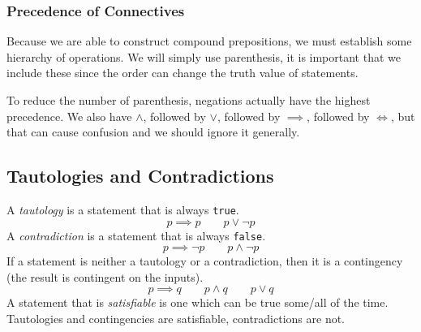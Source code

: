 \subsubsection{Precedence of Connectives}\label{ssub:precedence_of_connectives}

Because we are able to construct compound prepositions, we must establish some hierarchy of operations.
We will simply use parenthesis, it is important that we include these since the order can change the truth value of statements.
\begin{note}
    To reduce the number of parenthesis, negations actually have the highest precedence.
    We also have \(\land\), followed by \(\lor\), followed by \(\implies\), followed by \(\iff\), but that can cause confusion and we should ignore it generally.
\end{note}

\subsection{Tautologies and Contradictions}\label{sub:tautologies_and_contradictions}

A \emph{tautology} is a statement that is always \texttt{true}.
\[
    p \implies p \qquad p \lor \neg p
\]
A \emph{contradiction} is a statement that is always \texttt{false}.
\[
    p \implies \neg p \qquad p \land \neg p
\]
If a statement is neither a tautology or a contradiction, then it is a contingency (the result is contingent on the inputs).
\[
    p \implies q \qquad p \land q \qquad p \lor q
\]
A statement that is \emph{satisfiable} is one which can be true some/all of the time.
Tautologies and contingencies are satisfiable, contradictions are not.

